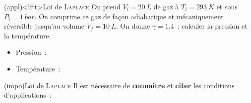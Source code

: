 \documentclass[../../main/main.tex]{subfiles}
\begin{document}
\begin{tcb}(appl)<lftt>{Loi de \textsc{Laplace}}
	On prend $V_i = \SI{20}{L}$ de gaz à $T_i = \SI{293}{K}$ et sous $P_i =
		\SI{1}{bar}$. On comprime ce gaz de façon adiabatique et mécaniquement
	réversible jusqu'au volume $V_f = \SI{10}{L}$. On donne $\gamma = \num{1.4}$~:
	calculer la pression et la température.
	\tcblower
	\begin{isd}
		\begin{itemize}
			\item Pression~:
		\end{itemize}
		\tcblower
		\begin{itemize}
			\item Température~:
		\end{itemize}
	\end{isd}
\end{tcb}

\begin{tcb*}(impo){Loi de \textsc{Laplace}}
	Il est nécessaire de \textbf{connaître} et \textbf{citer} les
	conditions d'applications~:
	\begin{tasks}[label=\bdmd]
		\task {}
		\task {}
		\task {}
	\end{tasks}
\end{tcb*}
\end{document}
